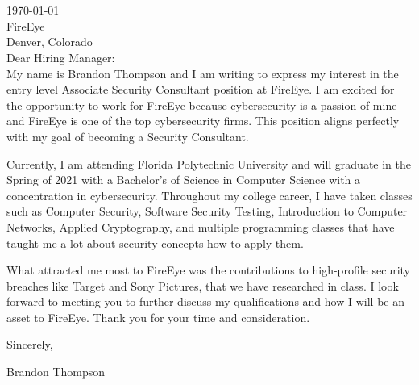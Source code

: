 \documentclass{resume} %
\begin{document}

\begin{rSection}{}
\ \\\
\\
\today \\
FireEye\\
Denver, Colorado\\


Dear Hiring Manager: \\

My name is Brandon Thompson and I am writing to express my interest in the entry level Associate Security Consultant position at FireEye.
I am excited for the opportunity to work for FireEye because cybersecurity is a passion of mine and FireEye is one of the top cybersecurity firms.
This position aligns perfectly with my goal of becoming a Security Consultant.

Currently, I am attending Florida Polytechnic University and will graduate in the Spring of 2021 with a Bachelor's of Science in Computer Science with a concentration in cybersecurity.
Throughout my college career, I have taken classes such as Computer Security, Software Security Testing, Introduction to Computer Networks, Applied Cryptography, and multiple programming classes that have taught me a lot about security concepts how to apply them.

What attracted me most to FireEye was the contributions to high-profile security breaches like Target and Sony Pictures, that we have researched in class.
I look forward to meeting you to further discuss my qualifications and how I will be an asset to FireEye.
Thank you for your time and consideration.


Sincerely,

Brandon Thompson


\end{rSection}
\end{document}
